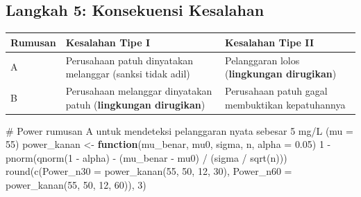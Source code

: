 \documentclass[
  indonesian,
  letterpaper,
]{book}
\newenvironment{Shaded}{\begin{snugshade}}{\end{snugshade}}
\newcommand{\AttributeTok}[1]{\textcolor[rgb]{0.40,0.45,0.13}{#1}}
\newcommand{\CommentTok}[1]{\textcolor[rgb]{0.37,0.37,0.37}{#1}}
\newcommand{\ControlFlowTok}[1]{\textcolor[rgb]{0.00,0.23,0.31}{\textbf{#1}}}
\newcommand{\DecValTok}[1]{\textcolor[rgb]{0.68,0.00,0.00}{#1}}
\newcommand{\FloatTok}[1]{\textcolor[rgb]{0.68,0.00,0.00}{#1}}
\newcommand{\FunctionTok}[1]{\textcolor[rgb]{0.28,0.35,0.67}{#1}}
\newcommand{\NormalTok}[1]{\textcolor[rgb]{0.00,0.23,0.31}{#1}}
\newcommand{\OtherTok}[1]{\textcolor[rgb]{0.00,0.23,0.31}{#1}}
\newcommand{\SpecialCharTok}[1]{\textcolor[rgb]{0.37,0.37,0.37}{#1}}
\newcounter{none} %
\begin{document}
\subsection{Langkah 5: Konsekuensi
Kesalahan}\label{langkah-5-konsekuensi-kesalahan}

{\def\LTcaptype{none} %
\begin{longtable}[]{@{}
  >{\raggedright\arraybackslash}p{}
  >{\raggedright\arraybackslash}p{}
  >{\raggedright\arraybackslash}p{}@{}}
\toprule\noalign{}
\begin{minipage}[b]{\linewidth}\raggedright
Rumusan
\end{minipage} & \begin{minipage}[b]{\linewidth}\raggedright
Kesalahan Tipe I
\end{minipage} & \begin{minipage}[b]{\linewidth}\raggedright
Kesalahan Tipe II
\end{minipage} \\
\midrule\noalign{}
\endhead
\bottomrule\noalign{}
\endlastfoot
A & Perusahaan patuh dinyatakan melanggar (sanksi tidak adil) &
Pelanggaran lolos (\textbf{lingkungan dirugikan}) \\
B & Perusahaan melanggar dinyatakan patuh (\textbf{lingkungan
dirugikan}) & Perusahaan patuh gagal membuktikan kepatuhannya \\
\end{longtable}
}

\begin{Shaded}
\begin{Highlighting}[]
\CommentTok{\# Power rumusan A untuk mendeteksi pelanggaran nyata sebesar 5 mg/L (mu = 55)}
\NormalTok{power\_kanan }\OtherTok{\textless{}{-}} \ControlFlowTok{function}\NormalTok{(mu\_benar, mu0, sigma, n, }\AttributeTok{alpha =} \FloatTok{0.05}\NormalTok{)}
  \DecValTok{1} \SpecialCharTok{{-}} \FunctionTok{pnorm}\NormalTok{(}\FunctionTok{qnorm}\NormalTok{(}\DecValTok{1} \SpecialCharTok{{-}}\NormalTok{ alpha) }\SpecialCharTok{{-}}\NormalTok{ (mu\_benar }\SpecialCharTok{{-}}\NormalTok{ mu0) }\SpecialCharTok{/}\NormalTok{ (sigma }\SpecialCharTok{/} \FunctionTok{sqrt}\NormalTok{(n)))}
\FunctionTok{round}\NormalTok{(}\FunctionTok{c}\NormalTok{(}\AttributeTok{Power\_n30 =} \FunctionTok{power\_kanan}\NormalTok{(}\DecValTok{55}\NormalTok{, }\DecValTok{50}\NormalTok{, }\DecValTok{12}\NormalTok{, }\DecValTok{30}\NormalTok{), }\AttributeTok{Power\_n60 =} \FunctionTok{power\_kanan}\NormalTok{(}\DecValTok{55}\NormalTok{, }\DecValTok{50}\NormalTok{, }\DecValTok{12}\NormalTok{, }\DecValTok{60}\NormalTok{)), }\DecValTok{3}\NormalTok{)}
\end{Highlighting}
\end{Shaded}
\end{document}
